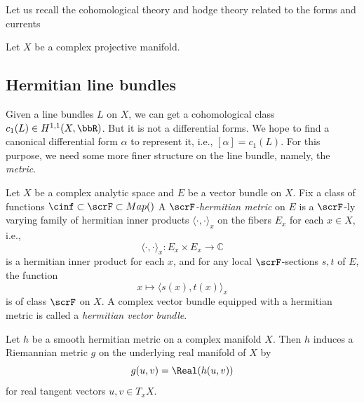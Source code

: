 \begin{proposition}[label=\labelNFM{prop:wedge-with-psh-function}, status=draft, tag=0000000]
	\Yang{}
\end{proposition}

\Yang{}


Let us recall the cohomological theory and hodge theory related to the forms and currents

\Yang{}

\begin{theorem}[label=\labelNFM{thm:cohomology-by-forms}, status=draft, tag=0000000]
	Let $X$ be a complex projective manifold.
\end{theorem}





\subsection[status=draft,tag=0000000,label=\labelNFM{subsec:review-of-metrics}]{Hermitian line bundles}

Given a line bundles $L$ on $X$, we can get a cohomological class $c_1(L) \in H^{1,1}(X,\bbR)$.
But it is not a differential forms.
We hope to find a canonical differential form $\alpha$ to represent it, i.e., $[\alpha] = c_1(L)$.
For this purpose, we need some more finer structure on the line bundle, namely, the \emph{metric}.

\begin{definition}[label=\labelNFM{def:hermitian-line-bundles}, status=draft, tag=0000000]
	Let $X$ be a complex analytic space and $E$ be a vector bundle on $X$.
	Fix a class of functions $\cinf \subset \scrF \subset Map()$
	A \emph{$\scrF$-hermitian metric} on $E$ is a $\scrF$-ly varying family of hermitian inner products \(\langle \cdot, \cdot \rangle_x\) on the fibers \(E_x\) for each \(x \in X\),
	i.e.,
	\[\langle \cdot, \cdot \rangle_x: E_x \times E_x \to \mathbb{C}\]
	is a hermitian inner product for each \(x\), and for any local $\scrF$-sections \(s,t\) of \(E\), the function
	\[x \mapsto \langle s(x), t(x) \rangle_x\]
	is of class $\scrF$ on \(X\).
	A complex vector bundle equipped with a hermitian metric is called a \emph{hermitian vector bundle}.
\end{definition}

\begin{remark}\label{rmk:Riemannian_metric_induced_by_hermitian_metric}
	Let \(h\) be a smooth hermitian metric on a complex manifold \(X\).
	Then \(h\) induces a Riemannian metric \(g\) on the underlying real manifold of \(X\) by
	\[g(u,v) = \Real(h(u,v))\]
	for real tangent vectors \(u,v \in T_x X\).
\end{remark}

